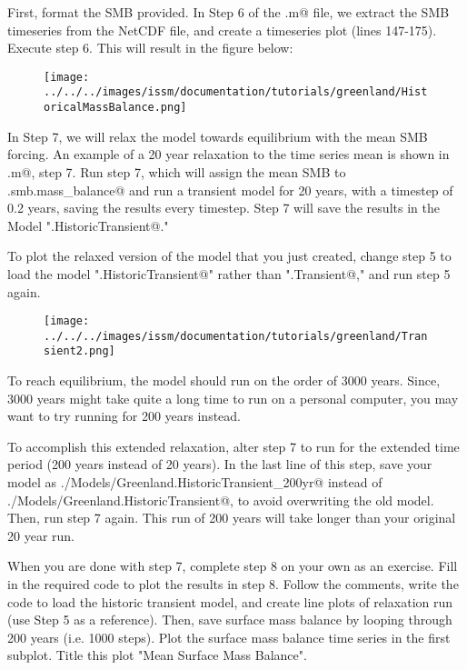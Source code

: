 First, format the SMB provided. In Step 6 of the \verb@runme.m@ file, we extract the SMB timeseries from the NetCDF file, and create a timeseries plot (lines 147-175). Execute step 6. This will result in the figure below:
\begin{figure}[H]
	\begin{center}
		\texttt{[image: ../../../images/issm/documentation/tutorials/greenland/HistoricalMassBalance.png]}
	\end{center}
\end{figure}

In Step 7, we will relax the model towards equilibrium with the mean SMB forcing. An example of a 20 year relaxation to the time series mean is shown in \verb@runme.m@, step 7. Run step 7, which will assign the mean SMB to \verb@md.smb.mass_balance@ and run a transient model for 20 years, with a timestep of 0.2 years, saving the results every timestep. Step 7 will save the results in the Model "\verb@Greenland.HistoricTransient@."

To plot the relaxed version of the model that you just created, change step 5 to load the model "\verb@Greenland.HistoricTransient@" rather than "\verb@Greenland.Transient@," and run step 5 again.

\begin{figure}[H]
	\begin{center}
		\texttt{[image: ../../../images/issm/documentation/tutorials/greenland/Transient2.png]}
	\end{center}
\end{figure}

To reach equilibrium, the model should run on the order of 3000 years. Since, 3000 years might take quite a long time to run on a personal computer, you may want to try running for 200 years instead.

To accomplish this extended relaxation, alter step 7 to run for the extended time period (200 years instead of 20 years). In the last line of this step, save your model as \verb@./Models/Greenland.HistoricTransient_200yr@ instead of \verb@./Models/Greenland.HistoricTransient@, to avoid overwriting the old model. Then, run step 7 again. This run of 200 years will take longer than your original 20 year run.

When you are done with step 7, complete step 8 on your own as an exercise. Fill in the required code to plot the results in step 8. Follow the comments, write the code to load the historic transient model, and create line plots of relaxation run (use Step 5 as a reference). Then, save surface mass balance by looping through 200 years (i.e. 1000 steps). Plot the surface mass balance time series in the first subplot. Title this plot "Mean Surface Mass Balance".

